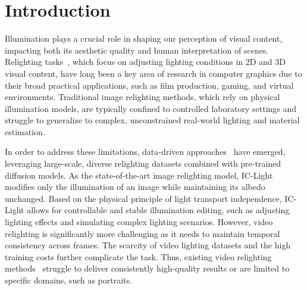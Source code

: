 \section{Introduction}
\label{sec:intro}
Illumination plays a crucial role in shaping our perception of visual content,
impacting both its aesthetic quality and human interpretation of scenes. 
Relighting tasks~\citep{sun2019single, nestmeyer2020learning, pandey2021total, zhou2019deep, sengupta2021light, hou2021towards, wang2023sunstage, zhou2023relightable, kocsis2024lightit}, which focus on adjusting lighting conditions in 2D and 3D visual content,
have long been a key area of research in computer graphics due to their broad practical applications,
such as film production, gaming, and virtual environments.
Traditional image relighting methods, which rely on physical illumination models, are typically confined to controlled laboratory settings and struggle to generalize to complex, unconstrained real-world lighting and material estimation.

In order to address these limitations, data-driven approaches~\citep{deng2025flashtex, ren2024relightful, kim2024switchlight, zhang2024lumisculpt, zeng2024dilightnet, jin2024neural} have emerged, 
leveraging large-scale, diverse relighting datasets combined with pre-trained diffusion models. 
As the state-of-the-art image relighting model, IC-Light~\citep{zhang2025scaling} modifies only the illumination of an image 
while maintaining its albedo unchanged.
Based on the physical principle of light transport independence, 
IC-Light allows for controllable and stable illumination editing, 
such as adjusting lighting effects and simulating complex lighting scenarios.
However, video relighting is significantly more challenging
as it needs to maintain temporal consistency across frames. 
The scarcity of video lighting datasets and the high training costs further complicate the task. 
Thus, existing video relighting methods~\citep{zhang2024lumisculpt}
struggle to deliver consistently high-quality results or
are limited to specific domains, such as portraits.



